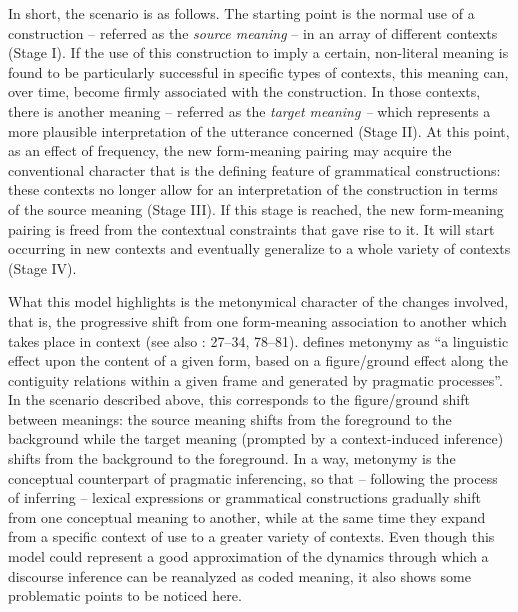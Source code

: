 In short, the scenario is as follows. The starting point is the normal use of a construction – referred as the \textit{source meaning} – in an array of different contexts (Stage I). If the use of this construction to imply a certain, non-literal meaning is found to be particularly successful in specific types of contexts, this meaning can, over time, become firmly associated with the construction. In those contexts, there is another meaning – referred as the \textit{target meaning –} which represents a more plausible interpretation of the utterance concerned (Stage II). At this point, as an effect of frequency, the new form-meaning pairing may acquire the conventional character that is the defining feature of grammatical constructions: these contexts no longer allow for an interpretation of the construction in terms of the source meaning (Stage III). If this stage is reached, the new form-meaning pairing is freed from the contextual constraints that gave rise to it. It will start occurring in new contexts and eventually generalize to a whole variety of contexts (Stage IV).

What this model highlights is the metonymical character of the changes involved, that is, the progressive shift from one form-meaning association to another which takes place in context (see also \citealt{TraugottDasher2002}: 27–34, 78–81). \citet[201]{Koch2001} defines metonymy as “a linguistic effect upon the content of a given form, based on a figure/ground effect along the contiguity relations within a given frame and generated by pragmatic processes”. In the scenario described above, this corresponds to the figure/ground shift between meanings: the source meaning shifts from the foreground to the background while the target meaning (prompted by a context-induced inference) shifts from the background to the foreground. In a way, metonymy is the conceptual counterpart of pragmatic inferencing, so that – following the process of inferring – lexical expressions or grammatical constructions gradually shift from one conceptual meaning to another, while at the same time they expand from a specific context of use to a greater variety of contexts. Even though this model could represent a good approximation of the dynamics through which a discourse inference can be reanalyzed as coded meaning, it also shows some problematic points to be noticed here.

